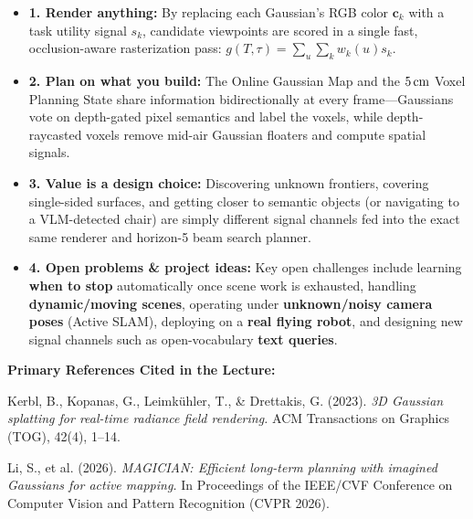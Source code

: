 \documentclass[11pt,a4paper]{article}
\theoremstyle{definition}
\theoremstyle{plain}
\theoremstyle{remark}
\begin{document}
\begin{itemize}[leftmargin=*]
    \item \textbf{1. Render anything:} By replacing each Gaussian's RGB color $\mathbf{c}_k$ with a task utility signal $s_k$, candidate viewpoints are scored in a single fast, occlusion-aware rasterization pass: $g(T, \tau) = \sum_u \sum_k w_k(u) s_k$.
    \item \textbf{2. Plan on what you build:} The Online Gaussian Map and the $5\text{\,cm}$ Voxel Planning State share information bidirectionally at every frame—Gaussians vote on depth-gated pixel semantics and label the voxels, while depth-raycasted voxels remove mid-air Gaussian floaters and compute spatial signals.
    \item \textbf{3. Value is a design choice:} Discovering unknown frontiers, covering single-sided surfaces, and getting closer to semantic objects (or navigating to a VLM-detected chair) are simply different signal channels fed into the exact same renderer and horizon-5 beam search planner.
    \item \textbf{4. Open problems \& project ideas:} Key open challenges include learning \textbf{when to stop} automatically once scene work is exhausted, handling \textbf{dynamic/moving scenes}, operating under \textbf{unknown/noisy camera poses} (Active SLAM), deploying on a \textbf{real flying robot}, and designing new signal channels such as open-vocabulary \textbf{text queries}.
\end{itemize}

\vspace{8pt}
\noindent\textbf{Primary References Cited in the Lecture:}
\begin{enumerate}[leftmargin=*, label={[\arabic*]}]
    \item Kerbl, B., Kopanas, G., Leimk{\"u}hler, T., \& Drettakis, G. (2023). \emph{3D Gaussian splatting for real-time radiance field rendering.} ACM Transactions on Graphics (TOG), 42(4), 1--14.
    \item Li, S., et al. (2026). \emph{MAGICIAN: Efficient long-term planning with imagined Gaussians for active mapping.} In Proceedings of the IEEE/CVF Conference on Computer Vision and Pattern Recognition (CVPR 2026).
\end{enumerate}

\newpage

\setcounter{section}{0}
\renewcommand{\thesection}{\arabic{section}}
\end{document}
